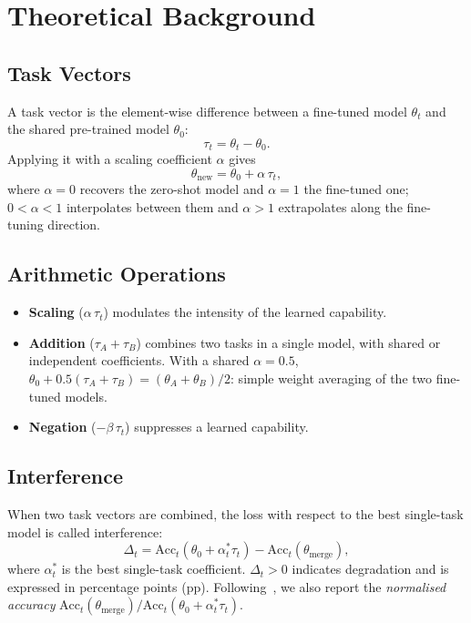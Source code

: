 \documentclass[11pt,a4paper,twocolumn]{article}
\begin{document}
\section{Theoretical Background}

\subsection{Task Vectors}
A task vector is the element-wise difference between a fine-tuned model
$\theta_t$ and the shared pre-trained model $\theta_0$:
\begin{equation}
  \tau_t = \theta_t - \theta_0 .
\end{equation}
Applying it with a scaling coefficient $\alpha$ gives
\begin{equation}
  \theta_{\text{new}} = \theta_0 + \alpha\,\tau_t ,
\end{equation}
where $\alpha=0$ recovers the zero-shot model and $\alpha=1$ the
fine-tuned one; $0<\alpha<1$ interpolates between them and $\alpha>1$
extrapolates along the fine-tuning direction.

\subsection{Arithmetic Operations}
\begin{itemize}
  \item \textbf{Scaling} ($\alpha\,\tau_t$) modulates the intensity of the
  learned capability.
  \item \textbf{Addition} ($\tau_A+\tau_B$) combines two tasks in a single
  model, with shared or independent coefficients. With a shared
  $\alpha=0.5$, $\theta_0+0.5(\tau_A+\tau_B)=(\theta_A+\theta_B)/2$:
  simple weight averaging of the two fine-tuned
  models.
  \item \textbf{Negation} ($-\beta\,\tau_t$) suppresses a learned
  capability.
\end{itemize}

\subsection{Interference}
When two task vectors are combined, the loss with respect to the best
single-task model is called interference:
\begin{equation}
  \Delta_t = \mathrm{Acc}_t\!\left(\theta_0+\alpha^*_t\tau_t\right)
           - \mathrm{Acc}_t\!\left(\theta_{\text{merge}}\right),
\end{equation}
where $\alpha^*_t$ is the best single-task coefficient. $\Delta_t>0$
indicates degradation and is expressed in percentage points (pp).
Following~\citet{ilharco2023}, we also report the \emph{normalised
accuracy}
$\mathrm{Acc}_t(\theta_{\text{merge}})/\mathrm{Acc}_t(\theta_0+\alpha^*_t\tau_t)$.
\end{document}
